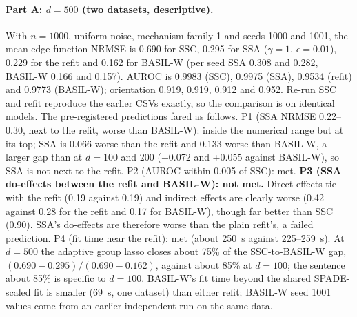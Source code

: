 \paragraph{Part A: $d=500$ (two datasets, descriptive).} With $n=1000$, uniform noise, mechanism family 1 and seeds 1000 and 1001, the mean edge-function NRMSE is 0.690 for SSC, 0.295 for SSA ($\gamma=1$, $\epsilon=0.01$), 0.229 for the refit and 0.162 for BASIL-W (per seed SSA 0.308 and 0.282, BASIL-W 0.166 and 0.157). AUROC is 0.9983 (SSC), 0.9975 (SSA), 0.9534 (refit) and 0.9773 (BASIL-W); orientation 0.919, 0.919, 0.912 and 0.952. Re-run SSC and refit reproduce the earlier CSVs exactly, so the comparison is on identical models. The pre-registered predictions fared as follows. P1 (SSA NRMSE 0.22--0.30, next to the refit, worse than BASIL-W): inside the numerical range but at its top; SSA is 0.066 worse than the refit and 0.133 worse than BASIL-W, a larger gap than at $d=100$ and $200$ (+0.072 and +0.055 against BASIL-W), so SSA is not next to the refit. P2 (AUROC within 0.005 of SSC): met. \textbf{P3 (SSA do-effects between the refit and BASIL-W): not met.} Direct effects tie with the refit (0.19 against 0.19) and indirect effects are clearly worse (0.42 against 0.28 for the refit and 0.17 for BASIL-W), though far better than SSC (0.90). SSA's do-effects are therefore worse than the plain refit's, a failed prediction. P4 (fit time near the refit): met (about 250~s against 225--259~s). At $d=500$ the adaptive group lasso closes about 75\% of the SSC-to-BASIL-W gap, $(0.690-0.295)/(0.690-0.162)$, against about 85\% at $d=100$; the sentence about 85\% is specific to $d=100$. BASIL-W's fit time beyond the shared SPADE-scaled fit is smaller (69~s, one dataset) than either refit; BASIL-W seed 1001 values come from an earlier independent run on the same data.

